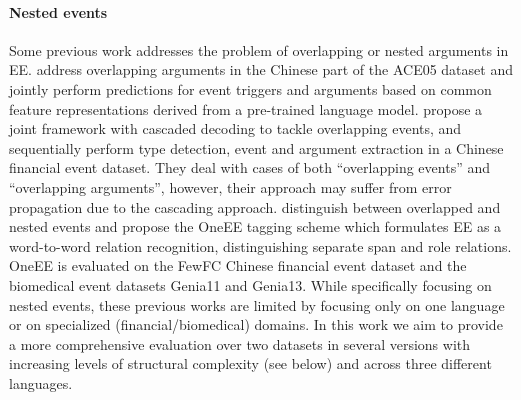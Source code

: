 \documentclass[11pt]{article}
\begin{document}
\paragraph{Nested events} Some previous work addresses the problem of overlapping or nested arguments in EE.
\citet{xu-etal-2020-novel} address overlapping arguments in the Chinese part of the ACE05 dataset and jointly perform predictions for event triggers and arguments based on common feature representations derived from a pre-trained language model.
\citet{sheng-etal-2021-casee} propose a joint framework with cascaded decoding to tackle overlapping events, and sequentially perform type detection, event and argument extraction in a Chinese financial event dataset.
They deal with cases of both ``overlapping events'' and ``overlapping arguments'', however, their approach may suffer from error propagation due to the cascading approach.
\citet{cao-etal-2022-oneee} distinguish between overlapped and nested events and propose the OneEE tagging scheme which formulates EE as a word-to-word relation recognition, distinguishing separate span and role relations. OneEE is
evaluated on the FewFC Chinese financial event dataset and the biomedical event datasets Genia11 and Genia13. While specifically focusing on nested events, these previous works are limited by focusing only on one language or on specialized (financial/biomedical) domains. In this work we aim to provide a more comprehensive evaluation over two datasets in several versions with increasing levels of structural complexity (see below) and across three different languages.
\end{document}
